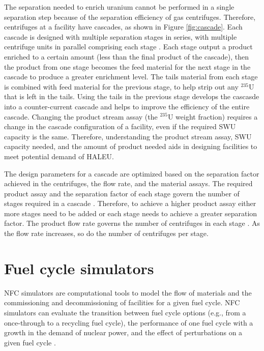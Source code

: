 The separation needed to enrich uranium cannot be performed 
in a single 
separation step because of the separation efficiency of gas centrifuges. 
Therefore, centrifuges at a facility have  
cascades, as shown in Figure \ref{fig:cascade}. Each cascade is designed with 
multiple separation stages in series, with multiple centrifuge units in 
parallel comprising each stage \cite{villani_uranium_1979}. Each stage 
output a product enriched to a certain 
amount (less than the final product of the cascade), then the product from 
one 
stage becomes the feed material for the next stage in the cascade to produce 
a greater enrichment level. The tails material from each 
stage is combined with feed material for the previous stage, to help strip 
out any $^{235}$U that is left in the tails. Using the tails in the 
previous stage develops the cascasde into a counter-current cascade 
\cite{villani_uranium_1979} and helps to improve the efficiency of the entire cascade. 
Changing the product stream assay (the $^{235}$U weight fraction)
requires a change in the cascade configuration of 
a facility, even if the required \gls{SWU} capacity is the same. Therefore, 
understanding the product stream assay, \gls{SWU} capacity needed, and the 
amount of product needed aids in designing facilities to meet potential 
demand of \gls{HALEU}.



The design parameters for a cascade are optimized based on the separation 
factor 
achieved in the centrifuges, the flow rate, and the material assays. 
The required product assay and the separation factor of each stage govern 
the number of stages required in a cascade \cite{whitaker_uranium_2019}. 
Therefore, to achieve a higher product assay either more stages 
need to be added or each stage needs to achieve a greater separation
factor. The product flow rate governs the number of centrifuges in 
each stage \cite{whitaker_uranium_2019}. As the flow rate increases, 
so do the number of centrifuges per stage. 


%
%
%
\section{Fuel cycle simulators}
\gls{NFC} simulators are computational tools to model the flow of materials
and the commissioning and decommissioning of facilities for a given fuel 
cycle. \gls{NFC} simulators can evaluate the transition between fuel cycle 
options (e.g., from a once-through to a recycling fuel cycle), the 
performance of one fuel cycle with a growth in the demand of nuclear power, 
and the effect of perturbations on a given fuel cycle \cite{piet_dynamic_2011}. 

